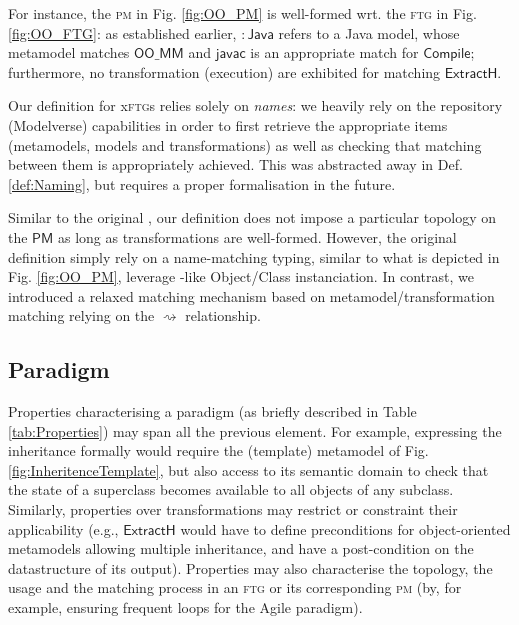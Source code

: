 For instance, the \textsc{pm} in Fig. \ref{fig:OO_PM} is well-formed wrt. 
the \textsc{ftg} in Fig. \ref{fig:OO_FTG}: as established earlier, 
$\mathsf{:\!Java}$ refers to a Java model, whose metamodel matches 
$\mathsf{OO\_MM}$ and $\mathsf{javac}$ is an appropriate match for 
$\mathsf{Compile}$; furthermore, no transformation (execution) are exhibited for 
matching $\mathsf{ExtractH}$.

Our definition for x\textsc{ftg}s relies solely on \emph{names}: we heavily 
rely on the repository (Modelverse) capabilities in order to first retrieve the 
appropriate items (metamodels, models and transformations) as well as checking 
that matching between them is appropriately achieved. This was abstracted away 
in Def. \ref{def:Naming}, but requires a proper formalisation in the future.

Similar to the original  
\cite{Mustafiz-etAl:2012,Lucio-Mustafiz-etAl:2013,TR:Lucio-Mustafiz-etAl:2012},
our definition does not impose a particular topology on the $\mathsf{PM}$ as 
long as transformations are well-formed. However, the original definition 
simply rely on a name-matching typing, similar to what is depicted in Fig. 
\ref{fig:OO_PM}, leverage \UML{}-like Object/Class instanciation. In contrast, 
we introduced a relaxed matching mechanism based on metamodel/transformation 
matching relying on the $\rightsquigarrow$ relationship.

\subsection{Paradigm}
\label{sec:PS}

Properties characterising a paradigm (as briefly described in Table 
\ref{tab:Properties}) may span all the previous element. For example, 
expressing the inheritance formally would require the 
(template) metamodel of Fig. \ref{fig:InheritenceTemplate}, but also access to 
its semantic domain to check that the state of a superclass becomes available 
to all objects of any subclass. Similarly, properties over transformations may 
restrict or constraint their applicability (e.g., $\mathsf{ExtractH}$ would have 
to define preconditions for object-oriented metamodels allowing multiple 
inheritance, and have a post-condition on the datastructure of its output). 
Properties may also characterise the topology, the usage and the matching 
process in an \textsc{ftg} or its corresponding \textsc{pm} (by, for example, 
ensuring frequent loops for the Agile paradigm). 

